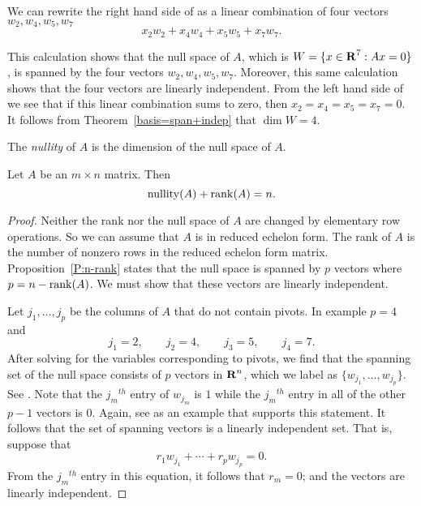\documentclass{ximera}
\begin{document}
\noindent We can rewrite the right hand side of 
as a linear combination of four
vectors $w_2,w_4,w_5,w_7$
\begin{equation}   \label{e:w'scomb}
x_2w_2 + x_4w_4 + x_5w_5 + x_7w_7.
\end{equation}

This calculation shows that the null space of $A$, which is
$W=\{x\in\mbox{$\bf{R}$}^7:Ax=0\}$, is spanned by the four vectors
$w_2,w_4,w_5,w_7$.  Moreover, this same calculation shows that
the four vectors  are linearly independent.
From the left hand side of  we see that if this
linear combination sums to zero, then $x_2=x_4=x_5=x_7=0$.  It
follows from Theorem~\ref{basis=span+indep} that $\dim W = 4$.

\begin{Def}  \label{D:nullity}
The {\em nullity\/} of $A$ is the dimension of the null space of $A$.
\end{Def} 

\begin{thm}  \label{T:dimsoln}
Let $A$ be an $m\times n$ matrix. Then
\[
{\rm nullity}(A) + {\rm rank}(A) = n.
\]
\end{thm} 

\begin{proof}	Neither the rank nor the null space of $A$ are changed by
elementary row operations.  So we can assume that $A$ is in reduced
echelon form.  The rank of $A$ is the number of nonzero rows in
the reduced echelon form matrix.  Proposition~\ref{P:n-rank} states that
the null space is spanned by $p$ vectors where $p=n-{\rm rank}(A)$.  We
must show that these vectors are linearly independent.

Let $j_1,\ldots,j_p$ be the columns of $A$ that do not contain pivots.
In example  $p=4$ and
\[
j_1 = 2, \qquad j_2 = 4, \qquad j_3 = 5, \qquad j_4 = 7.
\]
After solving for the variables corresponding to pivots, we find that
the spanning set of the null space consists of $p$ vectors in $\mbox{$\bf{R}$}^n$,
which we label as $\{w_{j_1},\ldots,w_{j_p}\}$.  See .
Note that the $j_m$$^{th}$  entry of $w_{j_m}$ is $1$ while the
$j_m$$^{th}$ entry in all of the other $p-1$ vectors is $0$.  Again,
see  as an example that supports this statement.  It
follows that the set of spanning vectors is a linearly independent set.
That is, suppose that
\[
r_1w_{j_1} + \cdots + r_pw_{j_p} = 0.
\]
From the $j_m$$^{th}$ entry in this equation, it follows that $r_m=0$;
and the vectors are linearly independent.  \end{proof}
\end{document}
